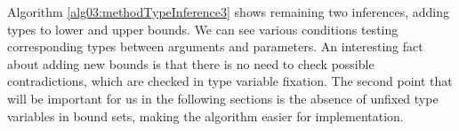 \par
{}
Algorithm \ref{alg03:methodTypeInference3} shows remaining two inferences, adding types to lower and upper bounds.
We can see various conditions testing corresponding types between arguments and parameters. 
An interesting fact about adding new bounds is that there is no need to check possible contradictions, which are checked in type variable fixation. 
The second point that will be important for us in the following sections is the absence of unfixed type variables in bound sets, making the algorithm easier for implementation.
\par
\begin{algorithm}



\end{algorithm}
